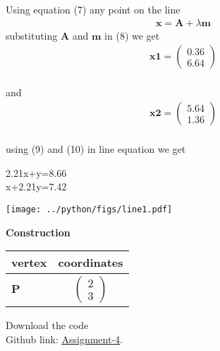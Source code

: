 \documentclass[10pt,a4paper]{report}
\newcommand{\myvec}[1]{\ensuremath{\begin{pmatrix}#1\end{pmatrix}}}
\let\vec\mathbf
\let\vec\mathbf
\begin{document}
\begin{multicols}{2}
Using equation (7) any point on the line  
 \begin{align}
	\label{eq:dir_line}
	\vec{x} = \vec{A} + \lambda \vec{m}
\end{align}
substituting $\vec{A}$ and $\vec{m}$ in (8) we get\\
\vspace{1mm}
\begin{align}
	\label{eq:dir_line}
	\vec{x1} = \myvec{
	0.36\\
	6.64
	}
\end{align}\\
and
\begin{align}
	\label{eq:dir_line}
	\vec{x2} = \myvec{
	5.64\\
	1.36
	}
\end{align}\\
using (9) and (10) in line equation we get\\
\begin{center}
2.21x+y=8.66\\
x+2.21y=7.42
\end{center}

\begin{center}
\texttt{[image: ../python/figs/line1.pdf]}  
 \end{center}\vspace{1mm}
 
 \vspace{2mm} \textbf{Construction}
\begin{center}
\setlength{\arrayrulewidth}{0.5mm}
\setlength{\tabcolsep}{6pt}
\renewcommand{\arraystretch}{1.5}
    \begin{tabular}{|l|c|}
    \hline 
    \textbf{vertex} & \textbf{coordinates} \\ \hline
   $\vec{P}$ & $\myvec{
   2\\
   3
   } $ \\\hline
  
      \end{tabular}
  \end{center}
  
\raggedright  Download the code \\
Github link: \href{https://github.com/KrishnaYadati/Assignments/blob/main/Matrix-line_assignment/line_program/line1.py}{Assignment-4}.
  \end{multicols}
\end{document}
